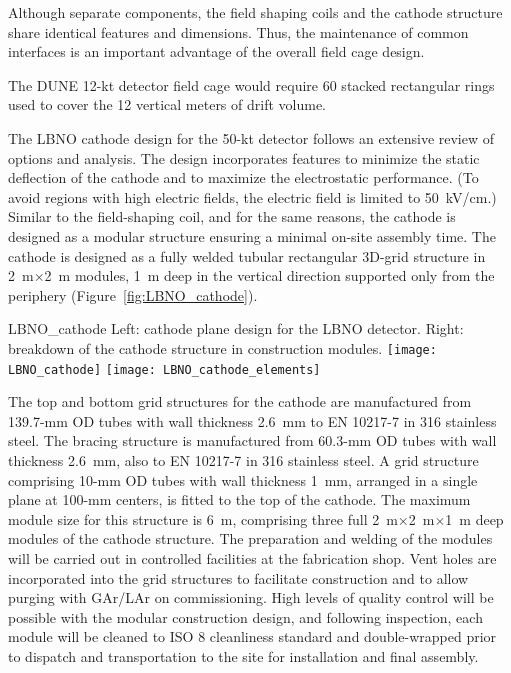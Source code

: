 Although separate components, the field shaping coils and the cathode
structure share identical features and dimensions.  Thus, the
maintenance of common interfaces is an important advantage of the
overall field cage design.
 
The DUNE 12-kt detector field cage would require 
60 stacked rectangular rings
used to cover the 12 vertical meters of drift volume.

The LBNO cathode design for the 50-kt detector follows an extensive
review of options and analysis. The design incorporates features to
minimize the static deflection of the cathode and to maximize the
electrostatic performance. (To avoid regions with high electric
fields, the electric field is limited to 50~kV/cm.)  Similar to the
field-shaping coil, and for the same reasons, the cathode is designed
as a modular structure ensuring a minimal on-site assembly
time. The cathode is designed as a fully welded tubular rectangular
 3D-grid structure in 2~m$\times$2~m modules, 
 1~m deep in the vertical
direction supported only from the periphery
(Figure~\ref{fig:LBNO_cathode}).
\begin{cdrfigure}{LBNO_cathode}
{\small Left: cathode plane design for the LBNO detector. Right: breakdown of 
the cathode structure in construction modules.}
\texttt{[image: LBNO\_cathode]} \hfil
\texttt{[image: LBNO\_cathode\_elements]}
\end{cdrfigure}

The top and bottom grid structures for the cathode are manufactured from 139.7-mm OD
tubes with wall thickness 2.6~mm to EN 10217-7 in 316 stainless steel.
The bracing structure is manufactured from 60.3-mm OD tubes with wall
thickness 2.6~mm, also to EN 10217-7 in 316 stainless steel.  A grid
structure comprising 10-mm OD tubes with wall thickness 1~mm, arranged
in a single plane at 100-mm centers, is fitted to the top of the
cathode.  The maximum module size for this structure is 6~m,
comprising three full 2~m$\times$2~m$\times$1~m deep modules of the
cathode structure.  The  preparation and welding of
the modules will be carried out in controlled facilities at the
fabrication shop.  Vent holes are incorporated into the grid structures to
facilitate construction and to allow purging with GAr/LAr on
commissioning. High levels of quality control will be possible with
the modular construction design, and following inspection, each module
will be cleaned to ISO 8 cleanliness standard and double-wrapped prior
to dispatch and transportation to the site for installation and final
assembly.

